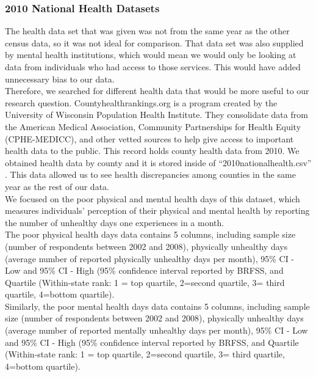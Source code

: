 \documentclass{article}
\begin{document}
\subsubsection{2010 National Health Datasets}
The health data set that was given was not from the same year as the other census data, so it was not ideal for comparison. That data set was also supplied by mental health institutions, which would mean we would only be looking at data from individuals who had access to those services. This would have added unnecessary bias to our data. \\

Therefore, we searched for different health data that would be more useful to our research question. Countyhealthrankings.org is a program created by the University of Wisconsin Population Health Institute. They consolidate data from the American Medical Association, Community Partnerships for Health Equity (CPHE-MEDICC), and other vetted sources to help give access to important health data to the public. This record holds county health data from 2010. We obtained health data by county and it is stored inside of “2010nationalhealth.csv” \cite{5}. This data allowed us to see health discrepancies among counties in the same year as the rest of our data. \\

We focused on the poor physical and mental health days of this dataset, which measures individuals’ perception of their physical and mental health by reporting the number of unhealthy days one experiences in a month.\\

The poor physical health days data contains 5 columns, including sample size (number of respondents between 2002 and 2008), physically unhealthy days (average number of reported physically unhealthy days per month), 95\% CI - Low and 95\% CI - High (95\% confidence interval reported by BRFSS, and Quartile (Within-state rank: 1 = top quartile, 2=second quartile, 3= third quartile, 4=bottom quartile). \\

Similarly, the poor mental health days data contains 5 columns, including sample size (number of respondents between 2002 and 2008), physically unhealthy days (average number of reported mentally unhealthy days per month), 95\% CI - Low and 95\% CI - High (95\% confidence interval reported by BRFSS, and Quartile (Within-state rank: 1 = top quartile, 2=second quartile, 3= third quartile, 4=bottom quartile). \\
\end{document}
